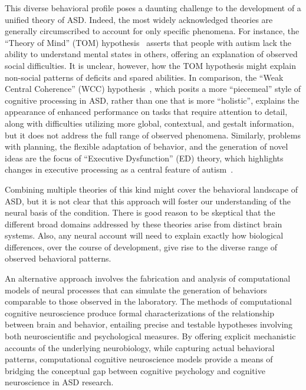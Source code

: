 This diverse behavioral profile poses a daunting challenge to the development of a unified theory of ASD. Indeed, the most widely acknowledged theories are generally circumscribed to account for only specific phenomena. For instance, the ``Theory of Mind'' (TOM) hypothesis~\cite{Baron-Cohen:1985:AutismTOM} asserts that people with autism lack the ability to understand mental states in others, offering an explanation of observed social difficulties. It is unclear, however, how the TOM hypothesis might explain non-social patterns of deficits and spared abilities. In comparison, the ``Weak Central Coherence'' (WCC) hypothesis~\cite{RefWorks:37}, which posits a more ``piecemeal'' style of cognitive processing in ASD, rather than one that is more ``holistic'', explains the appearance of enhanced performance on tasks that require attention to detail, along with difficulties utilizing more global, contextual, and gestalt information, but it does not address the full range of observed phenomena. Similarly, problems with planning, the flexible adaptation of behavior, and the generation of novel ideas are the focus of ``Executive Dysfunction'' (ED) theory, which highlights changes in executive processing as a central feature of autism~\cite{HughesC:1994:AutismExecutiveDysfunction,HillEL:2004:AutismExecutiveDysfunction,Ozonoff:1991:AutismExecutiveDysfunction}.  

Combining multiple theories of this kind might cover the behavioral landscape of ASD, but it is not clear that this approach will foster our understanding of the neural basis of the condition. There is good reason to be skeptical that the different broad domains addressed by these theories arise from distinct brain systems. Also, any neural account will need to explain exactly how biological differences, over the course of development, give rise to the diverse range of observed behavioral patterns.

An alternative approach involves the fabrication and analysis of computational models of neural processes that can simulate the generation of behaviors comparable to those observed in the laboratory. The methods of computational cognitive neuroscience produce formal characterizations of the relationship between brain and behavior, entailing precise and testable hypotheses involving both neuroscientific and psychological measures. By offering explicit mechanistic accounts of the underlying neurobiology, while capturing actual behavioral patterns, computational cognitive neuroscience models provide a means of bridging the conceptual gap between cognitive psychology and cognitive neuroscience in ASD research.

